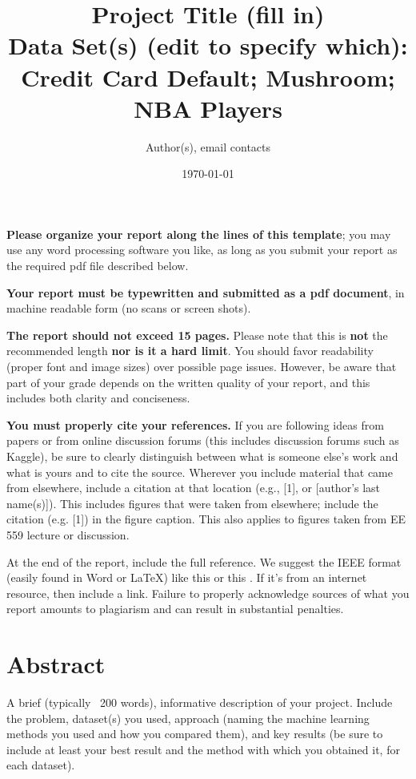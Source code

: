 \documentclass[singlecolumn]{article}
\begin{document}
\title{Project Title (fill in)\\
\large Data Set(s) (edit to specify which): Credit Card Default;  Mushroom; NBA Players}
\author{Author(s), email contacts}
\date{\today}
\maketitle

\textbf{Please organize your report along the lines of this template}; you may use any word processing software you like, as long as you submit your report as the required pdf file described below. 

\textbf{Your report must be typewritten and submitted as a pdf document}, in machine readable form (no scans or screen shots).
 
\textbf{The report should not exceed 15 pages.} Please note that this is \textbf{not} the recommended length \textbf{nor is it a hard limit}. You should favor readability (proper font and image sizes) over possible page issues. However, be aware that part of your grade depends on the written quality of your report, and this includes both clarity and conciseness.

\textbf{You must properly cite your references.} If you are following ideas from papers or from online discussion forums (this includes discussion forums such as Kaggle), be sure to clearly distinguish between what is someone else’s work and what is yours and to cite the source. Wherever you include material that came from elsewhere, include a citation at that location (e.g., [1], or [author’s last name(s)]). This includes figures that were taken from elsewhere; include the citation (e.g. [1]) in the figure caption. This also applies to figures taken from EE 559 lecture or discussion. 

At the end of the report, include the full reference. We suggest the IEEE format (easily found in Word or \LaTeX) like this \cite{latexReferencing} or this \cite{samplePaper}. If it’s from an internet resource, then include a link. Failure to properly acknowledge sources of what you report amounts to plagiarism and can result in substantial penalties. 

\section{Abstract}
A brief (typically ~200 words), informative description of your project. Include the problem, dataset(s) you used, approach (naming the machine learning methods you used and how you compared them), and key results (be sure to include at least your best result and the method with which you obtained it, for each dataset).
\end{document}
